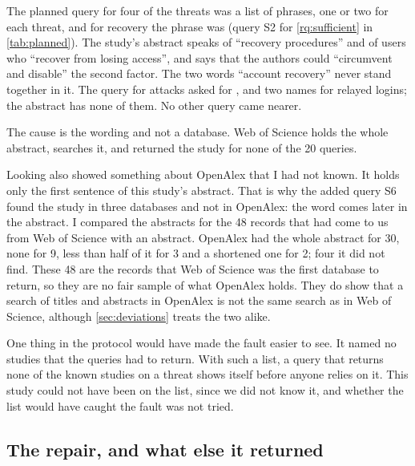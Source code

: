 The planned query for four of the threats was a list of phrases, one
or two for each threat, and for recovery the phrase was
 (query S2 for \cref{rq:sufficient} in
\cref{tab:planned}).
The study's abstract speaks of \enquote{recovery procedures} and of
users who \enquote{recover from losing access}, and says that the
authors could \enquote{circumvent and disable} the second factor.
The two words \enquote{account recovery} never stand together in it.
The query for attacks asked for ,  and two
names for relayed logins; the abstract has none of them.
No other query came nearer.

The cause is the wording and not a database.
Web of Science holds the whole abstract, searches it, and returned the
study for none of the 20 queries.

Looking also showed something about OpenAlex that I had not known.
It holds only the first sentence of this study's abstract.
That is why the added query S6 found the study in three databases and
not in OpenAlex: the word  comes later in the abstract.
I compared the abstracts for the 48 records that had come to us from
Web of Science with an abstract.
OpenAlex had the whole abstract for 30, none for 9, less than half of
it for 3 and a shortened one for 2; four it did not find.
These 48 are the records that Web of Science was the first database to
return, so they are no fair sample of what OpenAlex holds.
They do show that a search of titles and abstracts in OpenAlex is not
the same search as in Web of Science, although
\cref{sec:deviations} treats the two alike.

One thing in the protocol would have made the fault easier to see.
It named no studies that the queries had to return.
With such a list, a query that returns none of the known studies on a
threat shows itself before anyone relies on it.
This study could not have been on the list, since we did not know it,
and whether the list would have caught the fault was not tried.

\subsection{The repair, and what else it returned}

